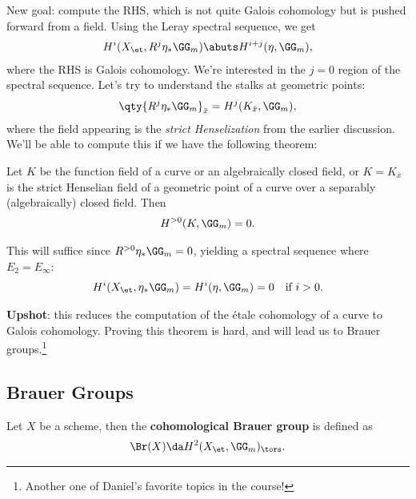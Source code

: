 New goal: compute the RHS, which is not quite Galois cohomology but is
pushed forward from a field. Using the Leray spectral sequence, we get
\begin{align*}  
H^i(X_\et, R^j \eta_* \GG_m)
\abuts
H^{i+j}(\eta, \GG_m)
,\end{align*} where the RHS is Galois cohomology. We're interested in
the \(j=0\) region of the spectral sequence. Let's try to understand the
stalks at geometric points:
\begin{align*}  
\qty{R^j \eta_* \GG_m}_{\bar x}
=
H^j(K_{\bar x}, \GG_m)
,\end{align*} where the field appearing is the \emph{strict
Henselization} from the earlier discussion. We'll be able to compute
this if we have the following theorem:

\begin{theorem}[?]

Let \(K\) be the function field of a curve or an algebraically closed
field, or \(K = K_{\bar x}\) is the strict Henselian field of a
geometric point of a curve over a separably (algebraically) closed
field. Then
\begin{align*}  
H^{>0}(K, \GG_m) = 0
.\end{align*}

\end{theorem}

This will suffice since \(R^{>0} \eta_*\GG_m = 0\), yielding a spectral
sequence where \(E_2 = E_ \infty\):
\begin{align*}  
H^i(X_\et, \eta_* \GG_m)
=
H^i(\eta,\GG_m)
=
0 && \text{if }i>0
.\end{align*}

\textbf{Upshot}: this reduces the computation of the étale cohomology of
a curve to Galois cohomology. Proving this theorem is hard, and will
lead us to Brauer groups.\footnote{Another one of Daniel's favorite
  topics in the course!}

\hypertarget{brauer-groups}{%
\subsection{Brauer Groups}\label{brauer-groups}}

\begin{definition}

Let \(X\) be a scheme, then the \textbf{cohomological Brauer group} is
defined as
\begin{align*}  
\Br (X) \da H^2(X_\et, \GG_m)_{\tors}
.\end{align*}

\end{definition}

